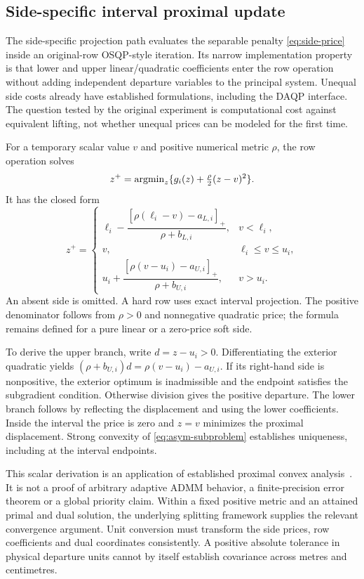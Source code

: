 \subsection{Side-specific interval proximal update}\label{sec:asymmetric}
The side-specific projection path evaluates the separable penalty
\eqref{eq:side-price} inside an original-row OSQP-style iteration. Its narrow
implementation property is that lower and upper linear/quadratic coefficients
enter the row operation without adding independent departure variables to the
principal system. Unequal side costs already have established formulations,
including the DAQP interface. The question tested by the original experiment
is computational cost against equivalent lifting, not whether unequal prices
can be modeled for the first time.

For a temporary scalar value $v$ and positive numerical metric $\rho$, the row
operation solves
\begin{equation}\label{eq:asym-subproblem}
 z^+=\operatorname{argmin}_z\{g_i(z)+\tfrac\rho2(z-v)^2\}.
\end{equation}
It has the closed form
\begin{equation}\label{eq:asym-prox}
z^+=\begin{cases}
\ell_i-\dfrac{[\rho(\ell_i-v)-a_{L,i}]_+}{\rho+b_{L,i}},&v<\ell_i,\\[5pt]
v,&\ell_i\leq v\leq u_i,\\[3pt]
u_i+\dfrac{[\rho(v-u_i)-a_{U,i}]_+}{\rho+b_{U,i}},&v>u_i.
\end{cases}
\end{equation}
An absent side is omitted. A hard row uses exact interval projection. The
positive denominator follows from $\rho>0$ and nonnegative quadratic price;
the formula remains defined for a pure linear or a zero-price soft side.

To derive the upper branch, write $d=z-u_i>0$. Differentiating the exterior
quadratic yields $(\rho+b_{U,i})d=\rho(v-u_i)-a_{U,i}$. If its right-hand side
is nonpositive, the exterior optimum is inadmissible and the endpoint satisfies
the subgradient condition. Otherwise division gives the positive departure.
The lower branch follows by reflecting the displacement and using the lower
coefficients. Inside the interval the price is zero and $z=v$ minimizes the
proximal displacement. Strong convexity of \eqref{eq:asym-subproblem} establishes
uniqueness, including at the interval endpoints.

This scalar derivation is an application of established proximal convex
analysis~\cite{prox,moreau,rockafellarppa}. It is not a proof of arbitrary adaptive
ADMM behavior, a finite-precision error theorem or a global priority claim.
Within a fixed positive metric and an attained primal and dual solution, the
underlying splitting framework supplies the relevant convergence argument.
Unit conversion must transform the side prices, row coefficients and dual
coordinates consistently. A positive absolute tolerance in physical departure
units cannot by itself establish covariance across metres and centimetres.

